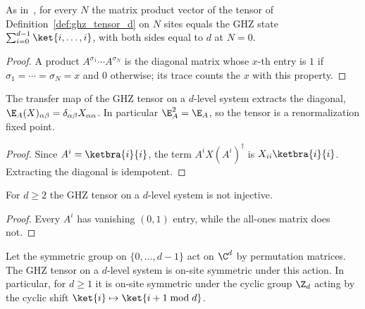 \begin{lemma}\label{thm:ghz_d_mpv}
    \leanok
    As in~\cite[Appendix~A, ``The GHZ
        state'']{Cirac2021Matrix}, for every $N$ the matrix product vector of
    the tensor of Definition~\ref{def:ghz_tensor_d} on $N$ sites equals the GHZ
    state $\sum_{i=0}^{d-1}\ket{i,\ldots,i}$, with both sides equal to $d$ at
    $N=0$.
\end{lemma}

\begin{proof}
    \leanok
    A product $A^{\sigma_1}\cdots A^{\sigma_N}$ is the diagonal matrix whose
    $x$-th entry is $1$ if $\sigma_1=\cdots=\sigma_N=x$ and $0$ otherwise; its
    trace counts the $x$ with this property.
\end{proof}

\begin{lemma}\label{thm:ghz_d_transfer}
    \leanok
    The transfer map of the GHZ tensor on a $d$-level system extracts the
    diagonal, $\E_A(X)_{\alpha\beta}=\delta_{\alpha\beta}X_{\alpha\alpha}$. In
    particular $\E_A^2=\E_A$, so the tensor is a renormalization fixed point.
\end{lemma}

\begin{proof}
    \leanok
    Since $A^i=\ketbra{i}{i}$, the term $A^iX(A^i)^\dagger$ is
    $X_{ii}\ketbra{i}{i}$. Extracting the diagonal is idempotent.
\end{proof}

\begin{lemma}\label{thm:ghz_d_not_injective}
    \leanok
    For $d\ge2$ the GHZ tensor on a $d$-level system is not injective.
\end{lemma}

\begin{proof}
    \leanok
    Every $A^i$ has vanishing $(0,1)$ entry, while the all-ones matrix does not.
\end{proof}

\begin{lemma}\label{thm:ghz_d_symmetric}
    \leanok
    Let the symmetric group on $\{0,\ldots,d-1\}$ act on $\C^d$ by permutation
    matrices. The GHZ tensor on a $d$-level system is on-site symmetric under
    this action. In particular, for $d\ge1$ it is on-site symmetric under the
    cyclic group $\Z_d$ acting by the cyclic shift
    $\ket{i}\mapsto\ket{i+1 \bmod d}$.
\end{lemma}

